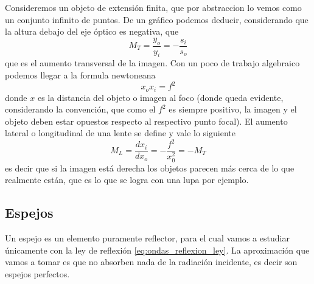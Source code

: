 \documentclass[a4paper,spanish]{article}
\numberwithin{equation}{section}
\begin{document}
		Consideremos un objeto de extensi\'on finita, que por abstraccion lo vemos como un conjunto infinito de puntos. De un gr\'afico podemos deducir, considerando que la altura debajo del eje \'optico es negativa, que
		\begin{equation}
			M_T = \frac{y_o}{y_i} = -\frac{s_i}{s_o}
			\label{eq:lentes_aumento_transversal}
		\end{equation}
		que es el aumento transversal de la imagen. Con un poco de trabajo algebraico podemos llegar a la formula newtoneana
		\begin{equation}
			x_o x_i = f^2
			\label{eq:lentes_newton}
		\end{equation}
		donde $x$ es la distancia del objeto o imagen al foco (donde queda evidente, considerando la convenci\'on, que como el $f^2$ es siempre positivo, la imagen y el objeto deben estar opuestos respecto al respectivo punto focal). El aumento lateral o longitudinal de una lente se define y vale lo siguiente
		\begin{equation}
			M_L = \frac{d x_i}{d x_o} = - \frac{f^2}{x_0^2} = - M_T
			\label{eq:lentes_aumento_lateral}
		\end{equation}
		es decir que si la imagen est\'a derecha los objetos parecen m\'as cerca de lo que realmente est\'an, que es lo que se logra con una lupa por ejemplo.
		
		\subsection{Espejos}
		Un espejo es un elemento puramente reflector, para el cual vamos a estudiar \'unicamente con la ley de reflexi\'on \ref{eq:ondas_reflexion_ley}. La aproximaci\'on que vamos a tomar es que no absorben nada de la radiaci\'on incidente, es decir son espejos perfectos. 
		
\end{document}
